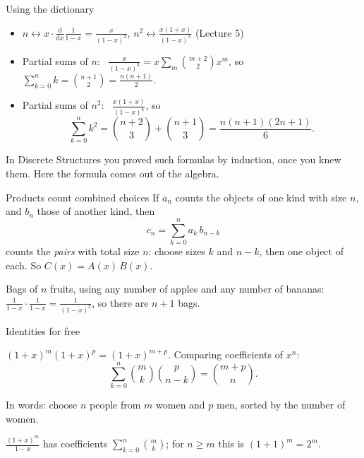 \documentclass{wosm-slides}
\begin{document}
\begin{frame}{Using the dictionary}
  \begin{itemize}
    \item $n \leftrightarrow x \cdot \frac{\mathrm{d}}{\mathrm{d}x} \frac{1}{1-x} = \frac{x}{(1-x)^2}$,
      \quad $n^2 \leftrightarrow \frac{x(1+x)}{(1-x)^3}$ \quad (Lecture 5)
  \end{itemize}
  \pause
  \begin{example}
    \begin{itemize}
      \item Partial sums of $n$: \
        $\frac{x}{(1-x)^3} = x \sum_m \binom{m+2}{2} x^m$, so
        $\sum_{k=0}^n k = \binom{n+1}{2} = \frac{n(n+1)}{2}$.
      \item Partial sums of $n^2$: \ $\frac{x(1+x)}{(1-x)^4}$, so
        \[ \sum_{k=0}^n k^2 = \binom{n+2}{3} + \binom{n+1}{3} = \frac{n(n+1)(2n+1)}{6} . \]
    \end{itemize}
  \end{example}
  {\small In Discrete Structures you proved such formulas by induction, once you knew them.
  Here the formula comes out of the algebra.\par}
\end{frame}

\begin{frame}{Products count combined choices}
  If $a_n$ counts the objects of one kind with size $n$, and $b_n$ those of another kind, then
  \[ c_n = \sum_{k=0}^{n} a_k\, b_{n-k} \]
  counts the \emph{pairs} with total size $n$: choose sizes $k$ and $n - k$, then one object of each.
  So $C(x) = A(x)\, B(x)$.
  \pause
  \begin{example}
    Bags of $n$ fruits, using any number of apples and any number of bananas:
    $\frac{1}{1-x} \cdot \frac{1}{1-x} = \frac{1}{(1-x)^2}$, so there are $n + 1$ bags.
  \end{example}
\end{frame}

\begin{frame}{Identities for free}
  \begin{example}
    $(1+x)^m (1+x)^p = (1+x)^{m+p}$. Comparing coefficients of $x^n$:
    \[ \sum_{k=0}^{n} \binom{m}{k}\binom{p}{n-k} = \binom{m+p}{n} . \]
  \end{example}
  {\small In words: choose $n$ people from $m$ women and $p$ men, sorted by the number of women.\par}
  \pause
  \begin{example}
    $\frac{(1+x)^m}{1-x}$ has coefficients $\sum_{k=0}^n \binom{m}{k}$; for $n \ge m$ this is
    $(1 + 1)^m = 2^m$.
  \end{example}
\end{frame}
\end{document}
